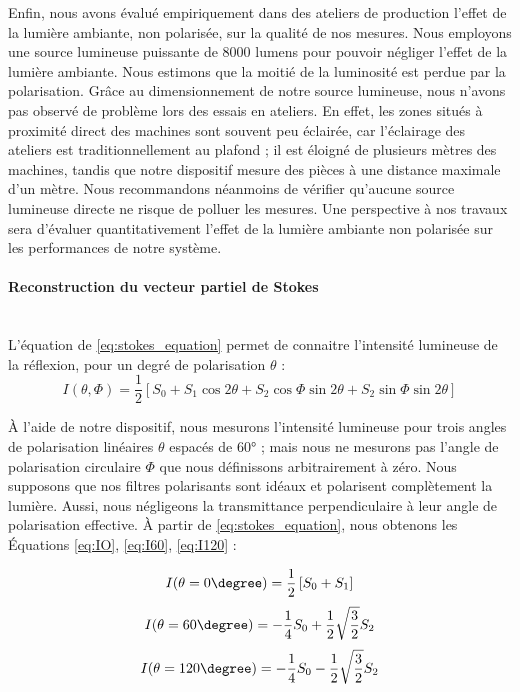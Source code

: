 Enfin, nous avons évalué empiriquement dans des ateliers de production l'effet de la lumière ambiante, non polarisée, sur la qualité de nos mesures.
Nous employons une source lumineuse puissante de 8000 lumens pour pouvoir négliger l'effet de la lumière ambiante.
Nous estimons que la moitié de la luminosité est perdue par la polarisation.
Grâce au dimensionnement de notre source lumineuse, nous n'avons pas observé de problème lors des essais en ateliers.
En effet, les zones situés à proximité direct des machines sont souvent peu éclairée, car l'éclairage des ateliers est traditionnellement au plafond ; il est éloigné de plusieurs mètres des machines, tandis que notre dispositif mesure des pièces à une distance maximale d'un mètre.
Nous recommandons néanmoins de vérifier qu'aucune source lumineuse directe ne risque de polluer les mesures.
Une perspective à nos travaux sera d'évaluer quantitativement l'effet de la lumière ambiante non polarisée sur les performances de notre système.

\paragraph{Reconstruction du vecteur partiel de Stokes}\mbox{} \\
L'équation de \citeauthor{stokes_composition_1851} \ref{eq:stokes_equation} permet de connaitre l'intensité lumineuse de la réflexion, pour un degré de polarisation $\theta$ \cite{stokes_composition_1851} :
\begin{equation} \label{eq:stokes_equation}
	I(\theta,\Phi) = \frac{1}{2}[S_0+S_1\cos 2\theta+S_2\cos \Phi \sin 2\theta+S_2\sin \Phi \sin 2\theta]
\end{equation}

À l'aide de notre dispositif, nous mesurons l'intensité lumineuse pour trois angles de polarisation linéaires $\theta$ espacés de 60° ; mais nous ne mesurons pas l'angle de polarisation circulaire $\Phi$ que nous définissons arbitrairement à zéro.
Nous supposons que nos filtres polarisants sont idéaux et polarisent complètement la lumière.
Aussi, nous négligeons la transmittance perpendiculaire à leur angle de polarisation effective.
À partir de \ref{eq:stokes_equation}, nous obtenons les Équations \ref{eq:IO}, \ref{eq:I60}, \ref{eq:I120} :

\begin{equation} \label{eq:IO}
	I(\theta=0\degree) = \frac{1}{2}\left[S_0 + S_1\right]
\end{equation}
\begin{equation} \label{eq:I60}
	I(\theta=60\degree) = -\frac{1}{4} S_0 + \frac{1}{2} \sqrt{\frac{3}{2}} S_2
\end{equation}
\begin{equation} \label{eq:I120}
	I(\theta=120\degree) = -\frac{1}{4} S_0 - \frac{1}{2} \sqrt{\frac{3}{2}} S_2
\end{equation}

